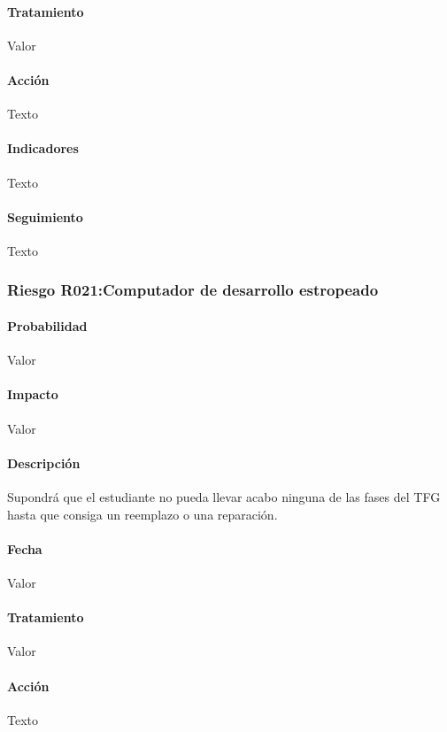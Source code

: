\documentclass[10pt,a4paper]{article}
\begin{document}
				\paragraph{Tratamiento} Valor %
				\paragraph{Acción} Texto %
				\paragraph{Indicadores} Texto %
				\paragraph{Seguimiento}	Texto %
				
				\subsubsection{Riesgo R021:Computador de desarrollo estropeado }
				\paragraph{Probabilidad} Valor
				\paragraph{Impacto}	Valor
				\paragraph{Descripción} Supondrá que el estudiante no pueda llevar acabo ninguna de las fases del TFG hasta que consiga un reemplazo o una reparación.
				\paragraph{Fecha} Valor %
				\paragraph{Tratamiento} Valor %
				\paragraph{Acción} Texto %
\end{document}
